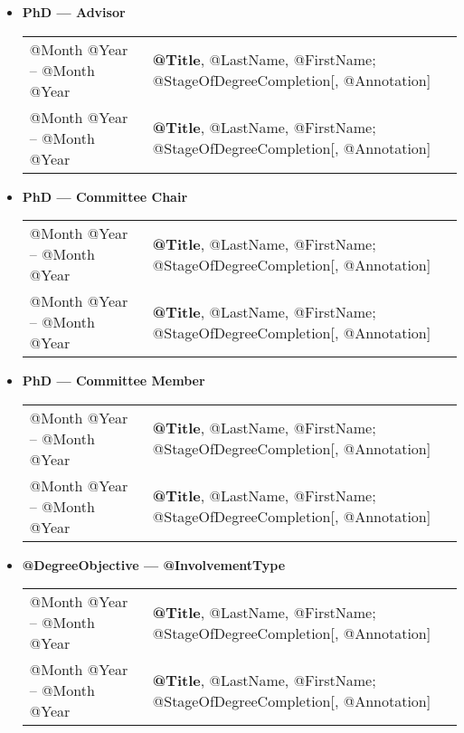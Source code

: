 \documentclass[10pt]{article}
\begin{document}
\begin{IOWA ONLY}
\begin{itemize}
\item[] \textbf{PhD --- Advisor}
\\[1.3ex]
\begin{tabular}{l@{\quad\ }p{30em}} 
 @Month @Year -- @Month @Year
 & {\bf @Title}, @LastName, @FirstName; @StageOfDegreeCompletion[, @Annotation]
 \\[.5ex]
 @Month @Year -- @Month @Year
 & {\bf @Title}, @LastName, @FirstName; @StageOfDegreeCompletion[, @Annotation]
 \\[.5ex]
\end{tabular}

\item[] \textbf{PhD --- Committee Chair} 
\\[1.3ex]
\begin{tabular}{l@{\quad\ }p{30em}} 
 @Month @Year -- @Month @Year
 & {\bf @Title}, @LastName, @FirstName; @StageOfDegreeCompletion[, @Annotation]
 \\[.5ex]
 @Month @Year -- @Month @Year
 & {\bf @Title}, @LastName, @FirstName; @StageOfDegreeCompletion[, @Annotation]
 \\[.5ex]
\end{tabular}

\item[] \textbf{PhD --- Committee Member}
\\[1.3ex]
\begin{tabular}{l@{\quad\ }p{30em}} 
 @Month @Year -- @Month @Year
 & {\bf @Title}, @LastName, @FirstName; @StageOfDegreeCompletion[, @Annotation]
 \\[.5ex]
 @Month @Year -- @Month @Year
 & {\bf @Title}, @LastName, @FirstName; @StageOfDegreeCompletion[, @Annotation]
 \\[.5ex]
\end{tabular}

\item[] \textbf{@DegreeObjective --- @InvolvementType}
\\[1.3ex]
\begin{tabular}{l@{\quad\ }p{30em}} 
 @Month @Year -- @Month @Year
 & {\bf @Title}, @LastName, @FirstName; @StageOfDegreeCompletion[, @Annotation]
 \\[.5ex]
 @Month @Year -- @Month @Year
 & {\bf @Title}, @LastName, @FirstName; @StageOfDegreeCompletion[, @Annotation]
 \\[.5ex]
\end{tabular}
\end{itemize}


\end{IOWA ONLY}
\end{document}
